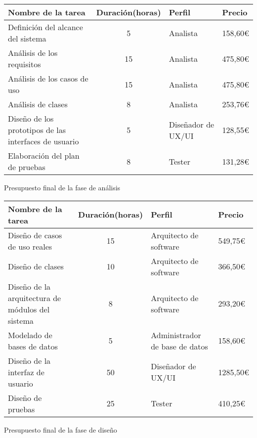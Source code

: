 \begin{planificacion}
	\centering
	\begin{tabular}{ | m{8.5cm} | c | m{2.5cm} |  m{1.5cm} |}
		\hline
		\textbf{Nombre de la tarea}                           & \textbf{Duración(horas)} & \textbf{Perfil}    & \textbf{Precio} \\\hline
		Definición del alcance del sistema                    & 5                        & Analista           & 158,60€         \\\hline
		Análisis de los requisitos                            & 15                       & Analista           & 475,80€         \\\hline
		Análisis de los casos de uso                          & 15                       & Analista           & 475,80€         \\\hline
		Análisis de clases                                    & 8                        & Analista           & 253,76€         \\\hline
		Diseño de los prototipos de las interfaces de usuario & 5                        & Diseñador de UX/UI & 128,55€         \\\hline
		Elaboración del plan de pruebas                       & 8                        & Tester             & 131,28€         \\\hline
	\end{tabular}
	\caption{Presupuesto final de la fase de análisis}
\end{planificacion}

\begin{planificacion}
	\centering
	\begin{tabular}{ | m{8.5cm} | c | m{2.5cm} |  m{1.5cm} |}
		\hline
		\textbf{Nombre de la tarea}                      & \textbf{Duración(horas)} & \textbf{Perfil}                & \textbf{Precio} \\\hline
		Diseño de casos de uso reales                    & 15                       & Arquitecto de software         & 549,75€         \\\hline
		Diseño de clases                                 & 10                       & Arquitecto de software         & 366,50€         \\\hline
		Diseño de la arquitectura de módulos del sistema & 8                        & Arquitecto de software         & 293,20€         \\\hline
		Modelado de bases de datos                       & 5                        & Administrador de base de datos & 158,60€         \\\hline
		Diseño de la interfaz de usuario                 & 50                       & Diseñador de UX/UI             & 1285,50€        \\\hline
		Diseño de pruebas                                & 25                       & Tester                         & 410,25€         \\\hline
	\end{tabular}
	\caption{Presupuesto final de la fase de diseño}
\end{planificacion}

